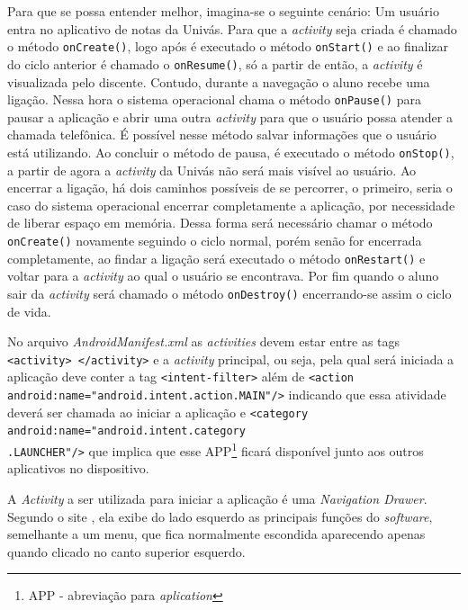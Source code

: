 	\par Para que se possa entender melhor, imagina-se o seguinte cenário: Um
usuário entra no aplicativo de notas da Univás. Para que a \textit{activity}
seja criada é chamado o método \texttt{onCreate()}, logo após é executado o
método \texttt{onStart()} e ao finalizar do ciclo anterior é chamado o
\texttt{onResume()}, só a partir de então, a \textit{activity} é visualizada
pelo discente. Contudo, durante a navegação o aluno recebe uma ligação. Nessa
hora o sistema operacional chama o método \texttt{onPause()} para pausar a
aplicação e abrir uma outra \textit{activity} para que o usuário possa atender
a chamada telefônica. É possível nesse método salvar informações que o
usuário está utilizando. Ao concluir o método de pausa, é executado o método
\texttt{onStop()}, a partir de agora a \textit{activity} da Univás não será
mais visível ao usuário. Ao encerrar a ligação, há dois caminhos possíveis de
se percorrer, o primeiro, seria o caso do sistema operacional encerrar
completamente a aplicação, por necessidade de liberar espaço em memória. Dessa
forma será necessário chamar o método \texttt{onCreate()} novamente seguindo o
ciclo normal, porém senão for encerrada completamente, ao findar a ligação será
executado o método \texttt{onRestart()} e voltar para a \textit{activity} ao
qual o usuário se encontrava. Por fim quando o aluno sair da \textit{activity}
será chamado o método \texttt{onDestroy()} encerrando-se assim o ciclo de vida.

	\par No arquivo \textit{AndroidManifest.xml} as \textit{activities} devem estar
entre as tags \texttt{<activity> </activity>} e a \textit{activity} principal,
ou seja, pela qual será iniciada a aplicação deve conter a tag
\texttt{<intent-filter>} além de {\tiny\texttt{<action
android:name="android.intent.action.MAIN"/>}} indicando que essa atividade
deverá ser chamada ao iniciar a aplicação e {\tiny\texttt{<category
android:name="android.intent.category\\.LAUNCHER"/>}} que implica que esse
APP\footnote{APP - abreviação para \textit{aplication}} ficará disponível junto
aos outros aplicativos no dispositivo.

	\par A \textit{Activity} a ser utilizada para iniciar a aplicação é uma
\textit{Navigation Drawer}. Segundo o site , ela exibe
do lado esquerdo as principais funções do \textit{software}, semelhante a um
menu, que fica normalmente escondida aparecendo apenas quando clicado no canto
superior esquerdo.

